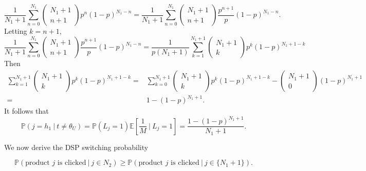 \documentclass[11pt]{article}
\theoremstyle{plain}
\theoremstyle{definition}
\theoremstyle{plain}
\theoremstyle{plain}
\theoremstyle{plain}
\theoremstyle{plain}
\numberwithin{equation}{section}
\begin{document}
\begin{equation*}
    \frac{1}{N_1+1} \sum_{n=0}^{N_1} \begin{pmatrix}
        N_1+1 \\
        n+1
    \end{pmatrix} p^n (1-p)^{N_1-n} = \frac{1}{N_1+1} \sum_{n=0}^{N_1} \begin{pmatrix}
        N_1+1 \\
        n+1
    \end{pmatrix} \frac{p^{n+1}}{p} (1-p)^{N_1-n}.
\end{equation*}
Letting $k = n+1$,
\begin{equation*}
    \frac{1}{N_1+1} \sum_{n=0}^{N_1} \begin{pmatrix}
        N_1+1 \\
        n+1
    \end{pmatrix} \frac{p^{n+1}}{p} (1-p)^{N_1-n} = \frac{1}{p(N_1+1)} \sum_{k=1}^{N_1+1} \begin{pmatrix}
        N_1+1 \\
        k
    \end{pmatrix} p^k (1-p)^{N_1+1-k}
\end{equation*}
Then
\begin{align*}
    \sum_{k=1}^{N_1+1} \begin{pmatrix}
        N_1+1 \\
        k
    \end{pmatrix} p^k (1-p)^{N_1+1-k} = & \sum_{k=0}^{N_1+1} \begin{pmatrix}
        N_1+1 \\
        k
    \end{pmatrix} p^k (1-p)^{N_1+1-k} - \begin{pmatrix}
        N_1+1 \\
        0
    \end{pmatrix} (1-p)^{N_1+1} \\[5pt]
    = & 1 - (1-p)^{N_1+1}.
\end{align*}
It follows that
\begin{equation*}
    \mathbb{P}(j = h_1 \ | \ t \neq \theta_U) = \mathbb{P}(L_j=1) \mathbb{E}\left[\frac{1}{M} \ \bigg| \ L_j=1\right] = \frac{1 - (1-p)^{N_1+1}}{N_1+1}.
\end{equation*}

We now derive the DSP switching probability

\begin{equation*}
     \mathbb{P}(\text{product } j \text{ is clicked} \ | \ j \in N_2 ) \geq \mathbb{P}(\text{product } j \text{ is clicked} \ | \ j \in \{N_{1}+1\} ).
\end{equation*}
\vspace{2mm}
\end{document}
